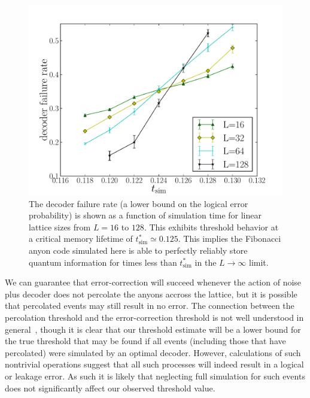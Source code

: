 \documentclass[aps, prl, letterpaper, twocolumn, superscriptaddress, notitlepage, 10pt]{revtex4}
\begin{document}
\begin{figure}[t!]
\begin{center}
	\includegraphics[width=\columnwidth]{anyons-kyle.pdf}
\caption{The decoder failure rate (a lower bound on the logical error probability) is shown as a function of simulation time for linear lattice sizes from $L=16$ to $128$. 
This exhibits threshold behavior at a critical memory lifetime of $t_{\mathrm{sim}}^*\simeq 0.125$. 
This implies the Fibonacci anyon code simulated here is able to perfectly reliably store quantum information for times less than $t_{\mathrm{sim}}^*$ in the $L\to \infty$ limit.}
\label{f:threshold}
\end{center}
\vspace{-10pt}
\end{figure}

We can guarantee that error-correction will succeed whenever
the action of noise plus decoder 
does not percolate the anyons accross the lattice,
but it is possible that percolated events may still result in no error. 
The connection between the percolation threshold and the error-correction threshold 
is not well understood in general~\cite{Hastings2014}, though it is clear 
that our threshold estimate will be a lower bound for 
the true threshold that may be found if all events 
(including those that have percolated) were simulated by an optimal decoder. 
However, calculations of such nontrivial operations suggest that all such 
processes will indeed result in a logical or leakage error.
As such it is likely that neglecting full simulation for 
such events does not significantly affect our observed threshold value.
\end{document}
